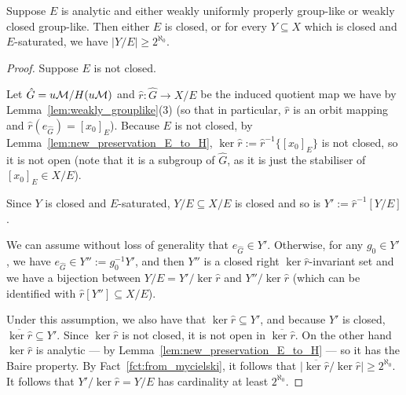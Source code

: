 	\begin{thm}
		\label{thm:general_cardinality_intransitive}
		Suppose $E$ is analytic and either weakly uniformly properly group-like or weakly closed group-like. Then either $E$ is closed, or for every $Y\subseteq X$ which is closed and $E$-saturated, we have $\lvert Y/E\rvert\geq 2^{\aleph_0}$.
	\end{thm}
	\begin{proof}
		Suppose $E$ is not closed.
		
		Let $\hat G=u{\mathcal M}/H(u{\mathcal M})$ and $\hat r\colon \hat G\to X/E$ be the induced quotient map we have by Lemma~\ref{lem:weakly_grouplike}(3) (so that in particular, $\hat r$ is an orbit mapping and $\hat r(e_{\hat G})=[x_0]_E$). Because $E$ is not closed, by Lemma~\ref{lem:new_preservation_E_to_H}, $\ker \hat r:=\hat r^{-1}\{[x_0]_E\}$ is not closed, so it is not open (note that it is a subgroup of $\hat G$, as it is just the stabiliser of $[x_0]_E\in X/E$).
		
		Since $Y$ is closed and $E$-saturated, $Y/E\subseteq X/E$ is closed and so is $Y':=\hat r^{-1}[Y/E]$.
		
		We can assume without loss of generality that $e_{\hat G}\in Y'$. Otherwise, for any $g_0\in Y'$, we have $e_{\hat G}\in Y'':=g_0^{-1}Y'$, and then $Y''$ is a closed right $\ker \hat r$-invariant set and we have a bijection between $Y/E=Y'/{\ker \hat r}$ and $Y''/{\ker \hat r}$ (which can be identified with $\hat r[Y'']\subseteq X/E$).
		
		Under this assumption, we also have that $\ker \hat r\subseteq Y'$, and because $Y'$ is closed, $\overline{\ker \hat r}\subseteq Y'$. Since $\ker \hat r$ is not closed, it is not open in $\overline {\ker \hat r}$. On the other hand ${\ker \hat r}$ is analytic --- by Lemma~\ref{lem:new_preservation_E_to_H} --- so it has the Baire property. By Fact~\ref{fct:from_mycielski}, it follows that $\lvert \overline{{\ker \hat r}}/{\ker \hat r}\rvert\geq 2^{\aleph_0}$. It follows that $Y'/{\ker \hat r}=Y/E$ has cardinality at least $2^{\aleph_0}$.
	\end{proof}

